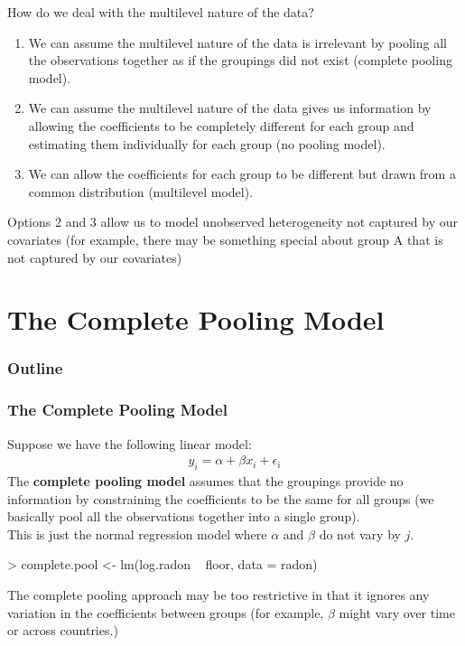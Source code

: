 \documentclass[handout]{beamer}
\begin{document}
\begin{frame}
How do we deal with the multilevel nature of the data?
\pause
\bigskip
\begin{enumerate}
\item We can assume the multilevel nature of the data is irrelevant
by pooling all the observations together as if the groupings did not
exist (complete pooling model).
\pause
\medskip
\item We can assume the multilevel nature of the data gives us
information by allowing the coefficients to be completely different for
each group and estimating them individually for each group (no pooling model).
\pause
\medskip
\item We can allow the coefficients for each group to be different but
drawn from a common distribution (multilevel model).
\end{enumerate}
\pause
\bigskip
Options 2 and 3 allow us to model unobserved heterogeneity not
captured by our covariates \pause (for example, there may be something
special about group A that is not captured by our covariates)
\end{frame}

\section{The Complete Pooling Model}

\begin{frame}
\frametitle{Outline}
\tableofcontents[currentsection]
\end{frame}

\begin{frame}[fragile]
\frametitle{The Complete Pooling Model}
Suppose we have the following linear model:
\pause
\begin{eqnarray*}
y_i = \alpha + \beta x_i + \epsilon_i
\end{eqnarray*}
\pause
The \textbf{complete pooling model} assumes that the groupings provide
no information by constraining the coefficients to be the same for all
groups \pause (we basically pool all the observations together into a single group).\\
\bigskip
\pause
This is just the normal regression model where $\alpha$ and $\beta$ do
not vary by $j$.\\
\medskip
\pause 
\tiny
\begin{Schunk}
\begin{Sinput}
> complete.pool <- lm(log.radon ~ floor, data = radon)
\end{Sinput}
\end{Schunk}
\normalsize
\bigskip
\pause
The complete pooling approach may be too restrictive in that it
ignores any variation in the coefficients between groups \pause (for
example, $\beta$ might vary over time or across countries.)
\end{frame}
\end{document}
